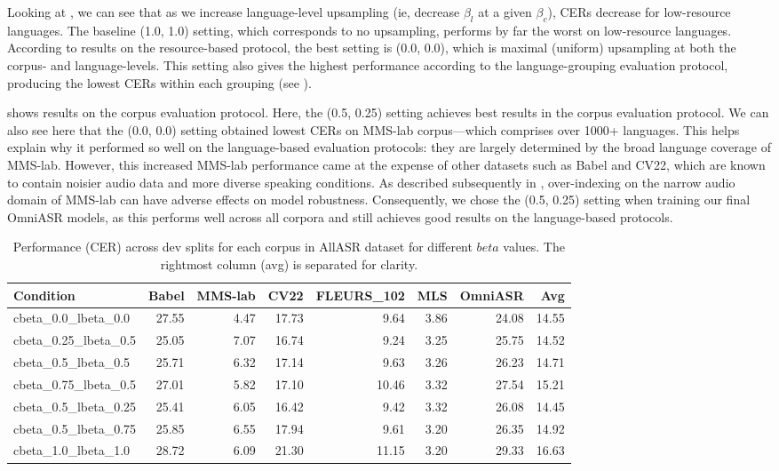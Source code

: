 Looking at , we can see that as we increase language-level upsampling (ie, decrease $\beta_l$ at a given $\beta_c$), CERs decrease for low-resource languages. The baseline (1.0, 1.0) setting, which corresponds to no upsampling, performs by far the worst on low-resource languages. According to results on the resource-based protocol, the best setting is (0.0, 0.0), which is maximal (uniform) upsampling at both the corpus- and language-levels. This setting also gives the highest performance according to the language-grouping evaluation protocol, producing the lowest CERs within each grouping (see ). 

 shows results on the corpus evaluation protocol. Here, the (0.5, 0.25) setting achieves best results in the corpus evaluation protocol. We can also see here that the (0.0, 0.0) setting obtained lowest CERs on MMS-lab corpus—which comprises over 1000+ languages. This helps explain why it performed so well on the language-based evaluation protocols: they are largely determined by the broad language coverage of MMS-lab. However, this increased MMS-lab performance came at the expense of other datasets such as Babel and CV22, which are known to contain noisier audio data and more diverse speaking conditions. As described subsequently in , over-indexing on the narrow audio domain of MMS-lab can have adverse effects on model robustness. Consequently, we chose the (0.5, 0.25) setting when training our final OmniASR models, as this performs well across all corpora and still achieves good results on the language-based protocols.

\begin{table}[htbp]
  \centering
  \begin{tabular}{l r r r r r r | r}
    \toprule
    Condition & Babel & MMS-lab & CV22 & FLEURS\_102 & MLS & OmniASR & Avg \\
    \midrule
    cbeta\_0.0\_lbeta\_0.0   & 27.55 & 4.47 & 17.73 & 9.64 & 3.86 & 24.08 & 14.55 \\
    cbeta\_0.25\_lbeta\_0.5  & 25.05 & 7.07 & 16.74 & 9.24 & 3.25 & 25.75 & 14.52 \\
    cbeta\_0.5\_lbeta\_0.5   & 25.71 & 6.32 & 17.14 & 9.63 & 3.26 & 26.23 & 14.71 \\
    cbeta\_0.75\_lbeta\_0.5  & 27.01 & 5.82 & 17.10 & 10.46 & 3.32 & 27.54 & 15.21 \\
    cbeta\_0.5\_lbeta\_0.25  & 25.41 & 6.05 & 16.42 & 9.42 & 3.32 & 26.08 & 14.45 \\
    cbeta\_0.5\_lbeta\_0.75  & 25.85 & 6.55 & 17.94 & 9.61 & 3.20 & 26.35 & 14.92  \\
    cbeta\_1.0\_lbeta\_1.0   & 28.72 & 6.09 & 21.30 & 11.15 & 3.20 & 29.33 & 16.63 \\
    \bottomrule
  \end{tabular}
  \caption{Performance (CER) across dev splits for each corpus in AllASR dataset for different $beta$ values. The rightmost column (avg) is separated for clarity.}
  \label{tab:upsampling_cer_results_corpus}
\end{table}


